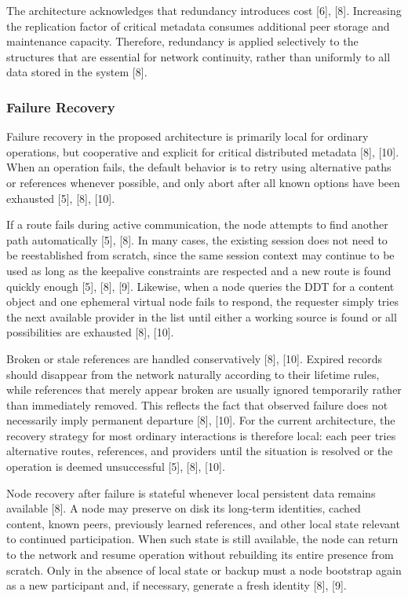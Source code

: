 \documentclass[12pt,a4paper]{article}
\begin{document}
The architecture acknowledges that redundancy introduces cost [6], [8]. Increasing the replication factor of critical metadata consumes additional peer storage and maintenance capacity. Therefore, redundancy is applied selectively to the structures that are essential for network continuity, rather than uniformly to all data stored in the system [8].

\subsubsection{Failure Recovery}

Failure recovery in the proposed architecture is primarily local for ordinary operations, but cooperative and explicit for critical distributed metadata [8], [10]. When an operation fails, the default behavior is to retry using alternative paths or references whenever possible, and only abort after all known options have been exhausted [5], [8], [10].

If a route fails during active communication, the node attempts to find another path automatically [5], [8]. In many cases, the existing session does not need to be reestablished from scratch, since the same session context may continue to be used as long as the keepalive constraints are respected and a new route is found quickly enough [5], [8], [9]. Likewise, when a node queries the DDT for a content object and one ephemeral virtual node fails to respond, the requester simply tries the next available provider in the list until either a working source is found or all possibilities are exhausted [8], [10].

Broken or stale references are handled conservatively [8], [10]. Expired records should disappear from the network naturally according to their lifetime rules, while references that merely appear broken are usually ignored temporarily rather than immediately removed. This reflects the fact that observed failure does not necessarily imply permanent departure [8], [10]. For the current architecture, the recovery strategy for most ordinary interactions is therefore local: each peer tries alternative routes, references, and providers until the situation is resolved or the operation is deemed unsuccessful [5], [8], [10].

Node recovery after failure is stateful whenever local persistent data remains available [8]. A node may preserve on disk its long-term identities, cached content, known peers, previously learned references, and other local state relevant to continued participation. When such state is still available, the node can return to the network and resume operation without rebuilding its entire presence from scratch. Only in the absence of local state or backup must a node bootstrap again as a new participant and, if necessary, generate a fresh identity [8], [9].
\end{document}
